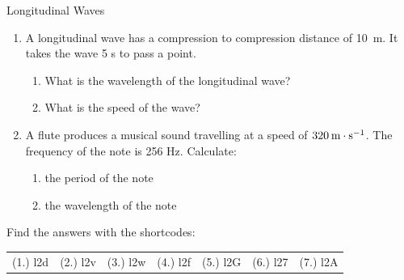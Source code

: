 \begin{eocexercises}{Longitudinal Waves}
\begin{enumerate}[noitemsep, label=\textbf{\arabic*}. ]
    \par
          \label{m38783*uid38}\item A longitudinal wave has a compression to compression distance of 10~m. It takes the wave 5 s to pass a point.
\label{m38783*id294078}\begin{enumerate}[noitemsep, label=\textbf{\alph*}. ] 
            \label{m38783*uid39}\item What is the wavelength of the longitudinal wave?
\label{m38783*uid40}\item What is the speed of the wave?
\end{enumerate}
                \label{m38783*uid41}\item A flute produces a musical sound travelling at a speed of $320\phantom{\rule{2pt}{0ex}}\text{m}\ensuremath{\cdot}\text{s}{}^{-1}$. The frequency of the note is 256 Hz. Calculate:
\label{m38783*id294137}\begin{enumerate}[noitemsep, label=\textbf{\alph*}. ] 
            \label{m38783*uid42}\item the period of the note
\label{m38783*uid43}\item the wavelength of the note
\end{enumerate}
                \end{enumerate}
  \label{m38783**end}
  \label{e91550bed2a1600e0ddb2572d580bf8e**end}
\par {} Find the answers with the shortcodes:
 \par \begin{tabular}[h]{cccccc}
 (1.) l2d  &  (2.) l2v  &  (3.) l2w  &  (4.) l2f  &  (5.) l2G  &  (6.) l27  &  (7.) l2A  & \end{tabular}
\end{eocexercises}
